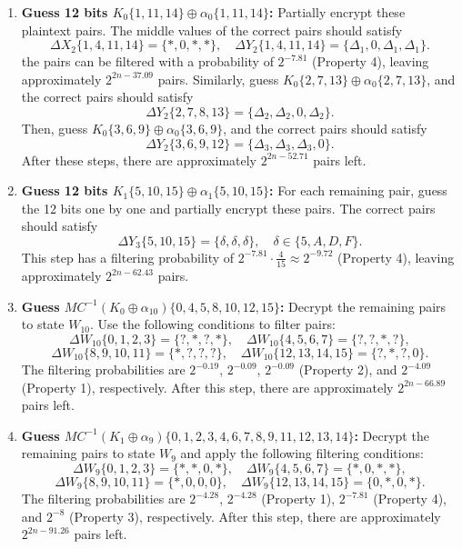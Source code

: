 \documentclass{article}
\begin{document}
\begin{enumerate}
    \item \textbf{Guess 12 bits $K_0\{1, 11, 14\} \oplus \alpha_0\{1, 11, 14\}$:}  
    Partially encrypt these plaintext pairs. The middle values of the correct pairs should satisfy  
    \[
    \Delta X_2\{1, 4, 11, 14\} = \{\ast, 0, \ast, \ast\}, \quad \Delta Y_2\{1, 4, 11, 14\} = \{\Delta_1, 0, \Delta_1, \Delta_1\}.
    \]  
    the pairs can be filtered with a probability of $2^{-7.81}$ (Property 4), leaving approximately $2^{2n-37.09}$ pairs.  
    Similarly, guess $K_0\{2, 7, 13\} \oplus \alpha_0\{2, 7, 13\}$, and the correct pairs should satisfy  
    \[
    \Delta Y_2\{2, 7, 8, 13\} = \{\Delta_2, \Delta_2, 0, \Delta_2\}.
    \]  
    Then, guess $K_0\{3, 6, 9\} \oplus \alpha_0\{3, 6, 9\}$, and the correct pairs should satisfy  
    \[
    \Delta Y_2\{3, 6, 9, 12\} = \{\Delta_3, \Delta_3, \Delta_3, 0\}.
    \]  
    After these steps, there are approximately $2^{2n-52.71}$ pairs left.

    \item \textbf{Guess 12 bits $K_1\{5, 10, 15\} \oplus \alpha_1\{5, 10, 15\}$:}  
    For each remaining pair, guess the 12 bits one by one and partially encrypt these pairs. The correct pairs should satisfy  
    \[
    \Delta Y_3\{5, 10, 15\} = \{\delta, \delta, \delta\}, \quad \delta \in \{5, A, D, F\}.
    \]  
    This step has a filtering probability of $2^{-7.81} \cdot \frac{4}{15} \approx 2^{-9.72}$ (Property 4), leaving approximately $2^{2n-62.43}$ pairs.

    \item \textbf{Guess $MC^{-1}(K_0 \oplus \alpha_{10})\{0, 4, 5, 8, 10, 12, 15\}$:}  
    Decrypt the remaining pairs to state $W_{10}$. Use the following conditions to filter pairs:
    \[
    \Delta W_{10}\{0, 1, 2, 3\} = \{?, \ast, ?, \ast\}, \quad \Delta W_{10}\{4, 5, 6, 7\} = \{?, ?, \ast, ?\},
    \]
    \[
    \Delta W_{10}\{8, 9, 10, 11\} = \{\ast, ?, ?, ?\}, \quad \Delta W_{10}\{12, 13, 14, 15\} = \{?, \ast, ?, 0\}.
    \]  
    The filtering probabilities are $2^{-0.19}$, $2^{-0.09}$, $2^{-0.09}$ (Property 2), and $2^{-4.09}$ (Property 1), respectively. After this step, there are approximately $2^{2n-66.89}$ pairs left.

    \item \textbf{Guess $MC^{-1}(K_1 \oplus \alpha_9)\{0, 1, 2, 3, 4, 6, 7, 8, 9, 11, 12, 13, 14\}$:}  
    Decrypt the remaining pairs to state $W_9$ and apply the following filtering conditions:
    \[
    \Delta W_9\{0, 1, 2, 3\} = \{\ast, \ast, 0, \ast\}, \quad \Delta W_9\{4, 5, 6, 7\} = \{\ast, 0, \ast, \ast\},
    \]
    \[
    \Delta W_9\{8, 9, 10, 11\} = \{\ast, 0, 0, 0\}, \quad \Delta W_9\{12, 13, 14, 15\} = \{0, \ast, 0, \ast\}.
    \]  
    The filtering probabilities are $2^{-4.28}$, $2^{-4.28}$ (Property 1), $2^{-7.81}$ (Property 4), and $2^{-8}$ (Property 3), respectively. After this step, there are approximately $2^{2n-91.26}$ pairs left.


\end{enumerate}
\end{document}
